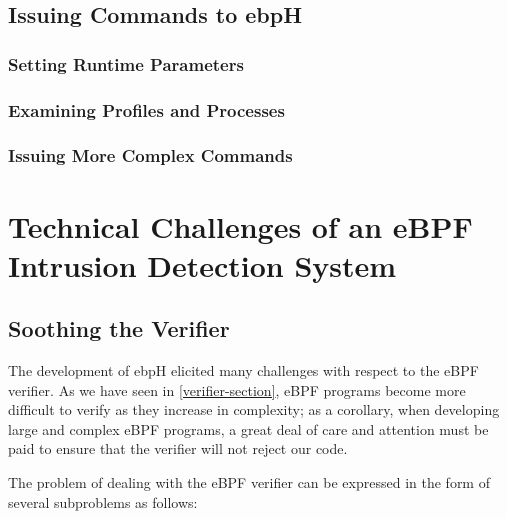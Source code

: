 \documentclass[
  12pt]{findlay}
\begin{document}
\FloatBarrier

\hypertarget{issuing-commands-to-ebph}{%
\subsection{Issuing Commands to ebpH}\label{issuing-commands-to-ebph}}

\hypertarget{setting-runtime-parameters}{%
\subsubsection{Setting Runtime
Parameters}\label{setting-runtime-parameters}}

\hypertarget{examining-profiles-and-processes}{%
\subsubsection{Examining Profiles and
Processes}\label{examining-profiles-and-processes}}

\hypertarget{issuing-more-complex-commands}{%
\subsubsection{Issuing More Complex
Commands}\label{issuing-more-complex-commands}}

\hypertarget{technical-challenges-of-an-ebpf-intrusion-detection-system}{%
\section{Technical Challenges of an eBPF Intrusion Detection
System}\label{technical-challenges-of-an-ebpf-intrusion-detection-system}}

\hypertarget{soothing-the-verifier}{%
\subsection{Soothing the Verifier}\label{soothing-the-verifier}}

The development of ebpH elicited many challenges with respect to the
eBPF verifier. As we have seen in \autoref{verifier-section}, eBPF
programs become more difficult to verify as they increase in complexity;
as a corollary, when developing large and complex eBPF programs, a great
deal of care and attention must be paid to ensure that the verifier will
not reject our code.

The problem of dealing with the eBPF verifier can be expressed in the
form of several subproblems as follows:
\end{document}
